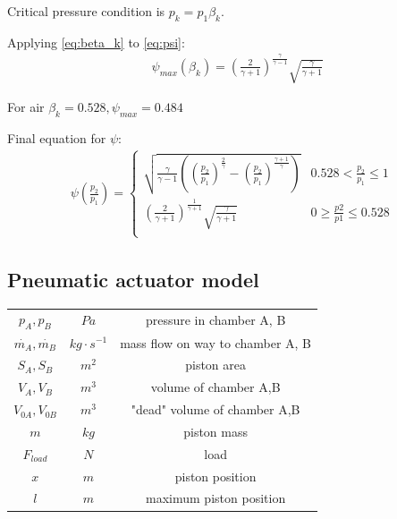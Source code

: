 \documentclass[class=article, crop=false]{standalone}
\begin{document}
Critical pressure condition is $p_k = p_1 \beta_k$.

Applying \ref{eq:beta_k} to \ref{eq:psi}:
\begin{align}
    &\psi_{max} (\beta_k) = 
    \left(\frac{2}{\gamma+1}\right)^\frac{\gamma}{\gamma-1}\sqrt{\frac{\gamma}{\gamma+1}}
\end{align}

For air $\beta_k = 0.528, \psi_{max} = 0.484$


Final equation for $\psi$:
\begin{align}
    \psi\left(\frac{p_2}{p_1}\right) = 
    \begin{cases}
    \sqrt{\frac{\gamma}{\gamma-1}\left(\left(\frac{p_2}{p_1}\right)^\frac{2}{\gamma} -
    \left(\frac{p_2}{p_1}\right)^\frac{\gamma + 1}{\gamma}\right)} & 0.528
    <\frac{p_2}{p_1} \le 1 \\
    \left(\frac{2}{\gamma +1}\right)^{\frac{1}{\gamma+1}}
    \sqrt{\frac{\gamma}{\gamma +1}} & 0 \ge \frac{p2}{p1} \le 0.528\\
    \end{cases}
\end{align}



\subsection{Pneumatic actuator model}
\begin{tabular}{ |c|c|c| }
    \hline
    $p_A, p_B$              & $Pa$              & pressure in chamber A, B \\
    $\dot{m_A}, \dot{m_B}$  & $kg \cdot s^{-1}$ & mass flow on way to chamber A, B \\
    $S_A, S_B$              & $m^2$             & piston area  \\
    $V_A, V_B$              & $m^3$             & volume of chamber A,B \\
    $V_{0A}, V_{0B}$        & $m^3$             & "dead" volume of chamber A,B \\
    $m$                     & $kg$              & piston mass\\
    $F_{load}$              & $N$               & load \\
    $x$                     & $m$               & piston position \\
    $l$                     & $m$               & maximum piston position \\
    \hline
\end{tabular}
\end{document}

